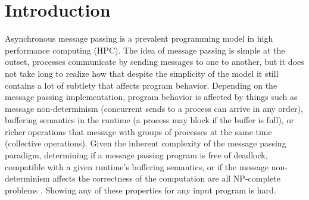  \section{Introduction}
Asynchronous message passing is a prevalent programming model in high performance computing (HPC).
The idea of message passing is simple at the outset, processes communicate by sending messages to one to another, but it does not take long to realize how that despite the simplicity of the model it still contains a lot of subtlety that affects program behavior. Depending on the message passing implementation, program behavior is affected by things such as message non-determinism (concurrent sends to a process can arrive in any order), buffering semantics in the runtime (a process may block if the buffer is full), or richer operations that message with groups of processes at the same time (collective operations). Given the inherent complexity of the message passing paradigm, determining if a message passing program is free of deadlock, compatible with a given runtime’s buffering semantics, or if the message non-determinism affects the correctness of the computation are all NP-complete problems \cite{DBLP:conf/kbse/HuangMM13,HuangNFM15,HuangDeadlock}. Showing any of these properties for any input program is hard.


